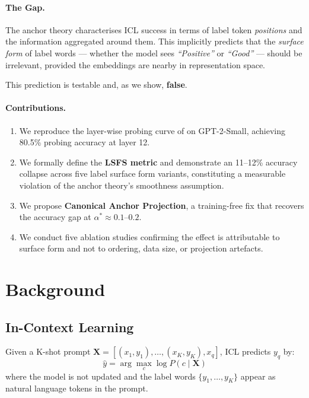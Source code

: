 \documentclass[11pt,a4paper]{article}
\begin{document}
\paragraph{The Gap.}
The anchor theory characterises ICL success in terms of label
token \emph{positions} and the information aggregated around
them. This implicitly predicts that the \emph{surface form}
of label words — whether the model sees
\textit{``Positive''} or \textit{``Good''} — should be
irrelevant, provided the embeddings are nearby in
representation space.

This prediction is testable and, as we show, \textbf{false}.

\paragraph{Contributions.}
\begin{enumerate}
  \item We reproduce the layer-wise probing curve of
        \citet{wang2023label} on GPT-2-Small, achieving
        80.5\% probing accuracy at layer 12.
  \item We formally define the \textbf{LSFS metric} and
        demonstrate an 11--12\% accuracy collapse across
        five label surface form variants, constituting a
        measurable violation of the anchor theory's
        smoothness assumption.
  \item We propose \textbf{Canonical Anchor Projection}, a
        training-free fix that recovers the accuracy gap
        at $\alpha^* \approx 0.1$--$0.2$.
  \item We conduct five ablation studies confirming the
        effect is attributable to surface form and not
        to ordering, data size, or projection artefacts.
\end{enumerate}

\section{Background}

\subsection{In-Context Learning}

Given a K-shot prompt $\mathbf{X} = [(x_1, y_1), \ldots,
(x_K, y_K), x_q]$, ICL predicts $y_q$ by:
$$\hat{y} = \arg\max_{c} \log P(c \mid \mathbf{X})$$
where the model is not updated and the label words
$\{y_1, \ldots, y_K\}$ appear as natural language tokens
in the prompt.
\end{document}
